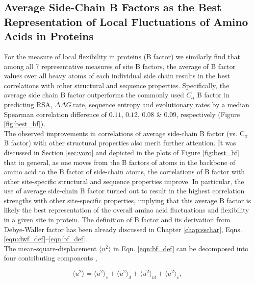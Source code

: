 \documentclass[11pt]{article}
\newcommand{\ddg}{$\Delta\Delta G~$}
\begin{document}
\begin{appendices}

\section{Average Side-Chain B Factors as the Best Representation of Local Fluctuations of Amino Acids in Proteins}
\label{app:best_bf}

    For the measure of local flexibility in proteins (B factor) we similarly find that among all $7$ representative measures of site B factors, the average of B factor values over all heavy atoms of each individual side chain results in the best correlations with other structural and sequence properties. Specifically, the average side chain B factor outperforms the commonly used $C_\alpha$ B factor in predicting RSA, \ddg rate, sequence entropy and evolutionary rates by a median Spearman correlation difference of $0.11$, $0.12$, $0.08$ \& $0.09$, respectively (Figure \ref{fig:best_bf}). \\


    The observed improvements in correlations of average side-chain B factor (vs. C$_\alpha$ B factor) with other structural properties also merit further attention. It was discussed in Section \ref{sec:voro} and depicted in the plots of Figure \ref{fig:best_bf} that in general, as one moves from the B factors of atoms in the backbone of amino acid to the B factor of side-chain atoms, the correlations of B factor with other site-specific structural and sequence properties improve. In particular, the use of average side-chain B factor turned out to result in the highest correlation strengths with other site-specific properties, implying that this average B factor is likely the best representation of the overall amino acid fluctuations and flexibility in a given site in protein.  The definition of B factor and its derivation from Debye-Waller factor has been already discussed in Chapter \ref{chap:sschar}, Eqns. \ref{eqn:dwf_def}--\ref{eqn:bf_def}. \\

    The mean-square-displacement $\langle u^2 \rangle$ in Eqn. \ref{eqn:bf_def} can be decomposed into four contributing components \cite{frauenfelder_temperature-dependent_1979},

    \begin{equation}
        \label{eqn:bf_comp}
        \langle u^2 \rangle = \langle u^2 \rangle_c + \langle u^2 \rangle_d + \langle u^2 \rangle_{ld} + \langle u^2 \rangle_v,
    \end {equation}


\end{appendices}
\end{document}
